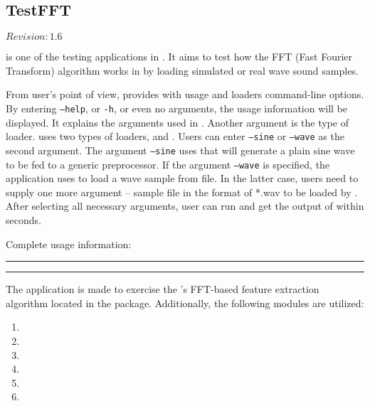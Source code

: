 \subsection{TestFFT}

$Revision: 1.6 $

 is one of the testing applications in {\marf}.
It aims to test how the FFT (Fast Fourier Transform) algorithm works in
 by loading simulated or real wave sound samples.

From user's point of view,  provides with usage and loaders
command-line options. By entering \texttt{--help}, or \texttt{-h}, or
even no arguments, the usage information will be displayed. It explains
the arguments used in . Another argument is the type of
loader.  uses two types of loaders,  and .
Users can enter \texttt{--sine} or \texttt{--wave} as the second argument.
The argument \texttt{--sine} uses  that will generate a
plain sine wave to be fed to a generic preprocessor.
If the argument \texttt{--wave} is specified, the application uses 
to load a wave sample from file. In the latter case, users need to supply
one more argument -- sample file in the format of *.wav to be loaded by .
After selecting all necessary arguments, user can run and get the output of  within seconds.

\noindent
Complete usage information:

\vspace{15pt}
\hrule

\hrule
\vspace{15pt}


The application is made to exercise the {\marf}'s
FFT-based feature extraction algorithm located in the  package.
Additionally, the following {\marf} modules are utilized:

\begin{enumerate}
\item
{}

\item
{}

\item
{}

\item
{}

\item
{}

\item
{}
\end{enumerate}

